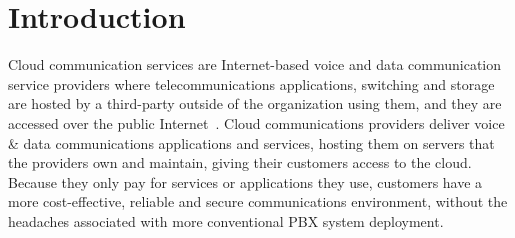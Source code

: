 \section{Introduction}
\label{sec-intro}

Cloud communication services are Internet-based voice and data communication service providers where telecommunications applications, switching and storage are hosted by a third-party outside of the organization using them, and they are accessed over the public Internet~\cite{wikicc}. 
Cloud communications providers deliver voice & data communications applications and services, hosting them on servers that the providers own and maintain, giving their customers access to the cloud. Because they only pay for services or applications they use, customers have a more cost-effective, reliable and secure communications environment, without the headaches associated with more conventional PBX system deployment.



